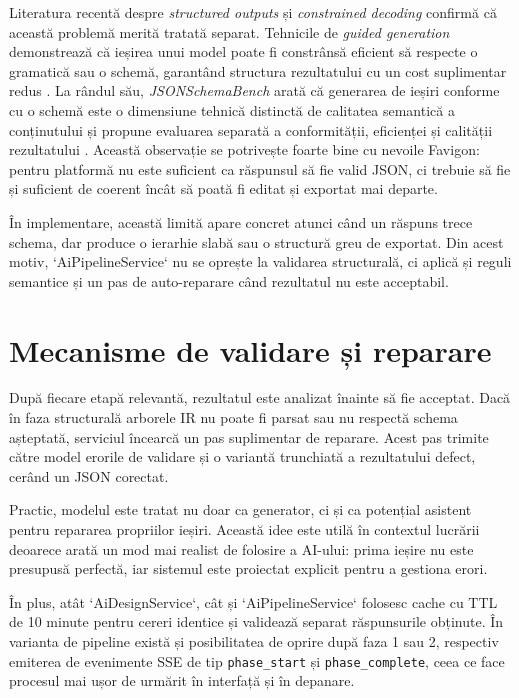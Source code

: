 Literatura recentă despre \textit{structured outputs} și \textit{constrained decoding} confirmă că această problemă merită tratată separat. Tehnicile de \textit{guided generation} demonstrează că ieșirea unui model poate fi constrânsă eficient să respecte o gramatică sau o schemă, garantând structura rezultatului cu un cost suplimentar redus \cite{willard2023guided}. La rândul său, \textit{JSONSchemaBench} arată că generarea de ieșiri conforme cu o schemă este o dimensiune tehnică distinctă de calitatea semantică a conținutului și propune evaluarea separată a conformității, eficienței și calității rezultatului \cite{geng2025jsonschemabench}. Această observație se potrivește foarte bine cu nevoile Favigon: pentru platformă nu este suficient ca răspunsul să fie valid JSON, ci trebuie să fie și suficient de coerent încât să poată fi editat și exportat mai departe.

În implementare, această limită apare concret atunci când un răspuns trece schema, dar produce o ierarhie slabă sau o structură greu de exportat. Din acest motiv, `AiPipelineService` nu se oprește la validarea structurală, ci aplică și reguli semantice și un pas de auto-reparare când rezultatul nu este acceptabil.

\section{Mecanisme de validare și reparare}

După fiecare etapă relevantă, rezultatul este analizat înainte să fie acceptat. Dacă în faza structurală arborele IR nu poate fi parsat sau nu respectă schema așteptată, serviciul încearcă un pas suplimentar de reparare. Acest pas trimite către model erorile de validare și o variantă trunchiată a rezultatului defect, cerând un JSON corectat.

Practic, modelul este tratat nu doar ca generator, ci și ca potențial asistent pentru repararea propriilor ieșiri. Această idee este utilă în contextul lucrării deoarece arată un mod mai realist de folosire a AI-ului: prima ieșire nu este presupusă perfectă, iar sistemul este proiectat explicit pentru a gestiona erori.

În plus, atât `AiDesignService`, cât și `AiPipelineService` folosesc cache cu TTL de 10 minute pentru cereri identice și validează separat răspunsurile obținute. În varianta de pipeline există și posibilitatea de oprire după faza 1 sau 2, respectiv emiterea de evenimente SSE de tip \texttt{phase\_start} și \texttt{phase\_complete}, ceea ce face procesul mai ușor de urmărit în interfață și în depanare.


